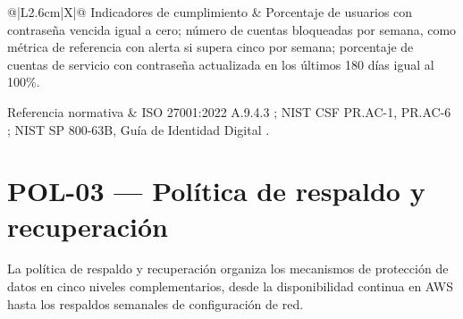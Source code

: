 \documentclass[11pt, a4paper, oneside]{report}
\begin{document}
\begin{xltabular}{\textwidth}{@{}|L{2.6cm}|X|@{}}
{\small Indicadores de cumplimiento} & {\small Porcentaje de usuarios con contraseña vencida igual a cero; número de cuentas bloqueadas por semana, como métrica de referencia con alerta si supera cinco por semana; porcentaje de cuentas de servicio con contraseña actualizada en los últimos 180 días igual al 100\%.} \\ \hline

{\small Referencia normativa} & {\small ISO 27001:2022 A.9.4.3 \citep{iso27001}; NIST CSF PR.AC-1, PR.AC-6 \citep{nistcsf}; NIST SP 800-63B, Guía de Identidad Digital \citep{nist80063b}.} \\ \hline

\end{xltabular}

\normalsize

\section{POL-03 — Política de respaldo y recuperación}

La política de respaldo y recuperación organiza los mecanismos de protección de datos en cinco niveles complementarios, desde la disponibilidad continua en AWS hasta los respaldos semanales de configuración de red.

\renewcommand{\arraystretch}{1.3}
\footnotesize
{}
\end{document}
